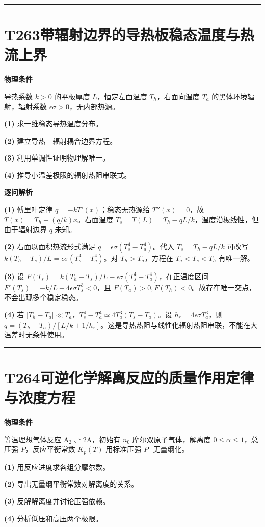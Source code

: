 \documentclass[UTF8,a4paper,11pt,oneside,openany]{ctexbook}
\begin{document}
\par\bigskip\hrule\bigskip
\section*{T263\quad 带辐射边界的导热板稳态温度与热流上界}
\textbf{物理条件}\par 导热系数 \(k>0\) 的平板厚度 \(L\)，恒定左面温度 \(T_h\)，右面向温度 \(T_a\) 的黑体环境辐射，辐射系数 \(\epsilon\sigma>0\)，无内部热源。
\par\noindent\textbf{(1)} 求一维稳态导热温度分布。
\par\noindent\textbf{(2)} 建立导热—辐射耦合边界方程。
\par\noindent\textbf{(3)} 利用单调性证明物理解唯一。
\par\noindent\textbf{(4)} 推导小温差极限的辐射热阻串联式。

\par\medskip\noindent\textbf{逐问解析}
\par\noindent\textbf{(1)} 傅里叶定律 \(q=-kT'(x)\)；稳态无热源给 \(T''(x)=0\)，故 \(T(x)=T_h-(q/k)x\)。右面温度 \(T_s=T(L)=T_h-qL/k\)，温度沿板线性，但由于辐射边界 \(q\) 未知。
\par\noindent\textbf{(2)} 右面以面积热流形式满足 \(q=\epsilon\sigma(T_s^4-T_a^4)\)。代入 \(T_s=T_h-qL/k\) 可改写 \(k(T_h-T_s)/L=\epsilon\sigma(T_s^4-T_a^4)\)。对 \(T_h>T_a\)，方程在 \(T_a<T_s<T_h\) 有唯一解。
\par\noindent\textbf{(3)} 设 \(F(T_s)=k(T_h-T_s)/L-\epsilon\sigma(T_s^4-T_a^4)\)，在正温度区间 \(F'(T_s)=-k/L-4\epsilon\sigma T_s^3<0\)，且 \(F(T_a)>0,F(T_h)<0\)。故存在唯一交点，不会出现多个稳定稳态。
\par\noindent\textbf{(4)} 若 \(|T_h-T_a|\ll T_a\)，\(T_s^4-T_a^4\simeq4T_a^3(T_s-T_a)\)。设 \(h_r=4\epsilon\sigma T_a^3\)，则 \(q=(T_h-T_a)/[L/k+1/h_r]\)。这是导热热阻与线性化辐射热阻串联，不能在大温差时无条件使用。

\par\bigskip\hrule\bigskip
\section*{T264\quad 可逆化学解离反应的质量作用定律与浓度方程}
\textbf{物理条件}\par 等温理想气体反应 \(\mathrm A_2\rightleftharpoons2\mathrm A\)，初始有 \(n_0\) 摩尔双原子气体，解离度 \(0\le\alpha\le1\)，总压强 \(P\)，反应平衡常数 \(K_p(T)\) 用标准压强 \(P^\circ\) 无量纲化。
\par\noindent\textbf{(1)} 用反应进度求各组分摩尔数。
\par\noindent\textbf{(2)} 导出无量纲平衡常数对解离度的关系。
\par\noindent\textbf{(3)} 反解解离度并讨论压强依赖。
\par\noindent\textbf{(4)} 分析低压和高压两个极限。
\end{document}
